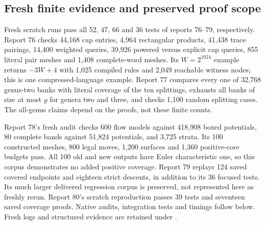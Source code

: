 \subsection{Fresh finite evidence and preserved proof scope}

Fresh scratch runs pass all 52, 47, 66 and 36 tests of reports 76--79,
respectively. Report 76 checks 44,168 cap entries, 4,964 rectangular
products, 41,438 trace pairings, 14,400 weighted queries, 39,926 powered
versus explicit cap queries, 855 literal pair meshes and 1,408 complete-word
meshes. Its $W=2^{1024}$ example returns $-3W+4$ with 1,025 compiled rules
and 2,049 reachable witness nodes; this is one compressed-language example.
Report 77 compares every one of 32,768 genus-two banks with literal coverage
of the ten splittings, exhausts all banks of size at most $g$ for genera
two and three, and checks 1,100 random splitting cases. The all-genus claims
depend on the proofs, not these finite counts.

Report 78's fresh audit checks 600 flow models against 418,908 boxed
potentials, 80 complete bands against 51,824 potentials, and 3,725 strata.
Its 100 constructed meshes, 800 legal moves, 1,200 surfaces and 1,360
positive-core budgets pass. All 100 old and new outputs have Euler
characteristic one, so this corpus demonstrates no added positive coverage.
Report 79 replays 124 saved covered endpoints and eighteen strict descents,
in addition to its 36 focused tests. Its much larger delivered regression
corpus is preserved, not represented here as freshly rerun.
Report 80's scratch reproduction passes 39 tests and seventeen saved
coverage proofs. Native audits, integration tests and timings follow below.
Fresh logs and structured evidence are retained under .
